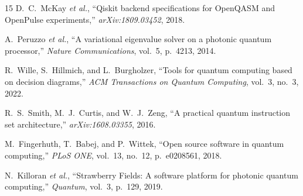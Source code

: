 \documentclass[conference]{IEEEtran}
\begin{document}
\begin{thebibliography}{15}
D.~C.~McKay \emph{et al.}, ``Qiskit backend specifications for OpenQASM and OpenPulse experiments,'' \emph{arXiv:1809.03452}, 2018.

A.~Peruzzo \emph{et al.}, ``A variational eigenvalue solver on a photonic quantum processor,'' \emph{Nature Communications}, vol.~5, p.~4213, 2014.

R.~Wille, S.~Hillmich, and L.~Burgholzer, ``Tools for quantum computing based on decision diagrams,'' \emph{ACM Transactions on Quantum Computing}, vol.~3, no.~3, 2022.

R.~S.~Smith, M.~J.~Curtis, and W.~J.~Zeng, ``A practical quantum instruction set architecture,'' \emph{arXiv:1608.03355}, 2016.

M.~Fingerhuth, T.~Babej, and P.~Wittek, ``Open source software in quantum computing,'' \emph{PLoS ONE}, vol.~13, no.~12, p.~e0208561, 2018.

N.~Killoran \emph{et al.}, ``Strawberry Fields: A software platform for photonic quantum computing,'' \emph{Quantum}, vol.~3, p.~129, 2019.

\end{thebibliography}
\end{document}
